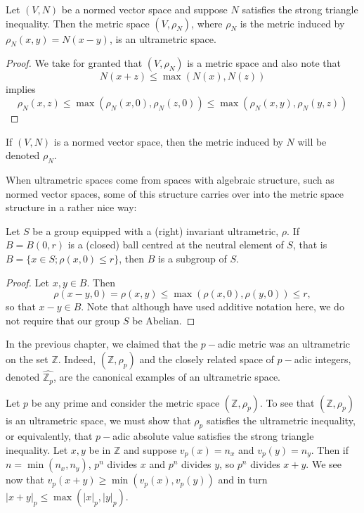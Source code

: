 \begin{proposition}
	Let $(V,N)$ be a normed vector space and suppose $N$ satisfies the strong triangle inequality. Then the metric space $(V,\rho_N)$, where $\rho_N$ is the metric induced by $\rho_N(x,y) = N(x-y)$, is an ultrametric space.
\end{proposition}

\begin{proof}
We take for granted that  $(V,\rho_N)$ is a metric space and also note that 
\[N(x + z) \leq \max(N(x), N(z))\]
 implies  
\[\rho_N(x,z) \leq \max(\rho_N(x,0), \rho_N(z,0)) \leq \max(\rho_N(x,y), \rho_N(y,z))\]
\end{proof}

\begin{notation*}
 If $(V, N)$ is a normed vector space, then the metric induced by $N$ will be denoted $\rho_N$.
\end{notation*}

When ultrametric spaces come from spaces with algebraic structure, such as normed vector spaces, some of this structure carries over into the metric space structure in a rather nice way:\\

\begin{proposition}
\cite{ar} Let $S$ be a  group equipped with a (right) invariant ultrametric, $\rho$. If $B=B(0,r)$ is a (closed) ball centred at the neutral element of $S$, that is $B=\{x \in S; \rho(x,0) \leq r\}$, then $B$ is a subgroup of $S$.
\end{proposition}

\begin{proof}
Let $x,y \in B$. Then \[\rho(x-y,0) = \rho(x,y)  \leq \max(\rho(x,0), \rho(y,0)) \leq r,\]
so that $x-y \in B$. Note that although have used additive notation here, we do not require that our group $S$ be Abelian.
\end{proof}
 
In the previous chapter, we claimed that the $p-$adic metric was an ultrametric on the set $\mathbb{Z}$. Indeed, $(\mathbb{Z}, \rho_p)$ and the closely related space of $p-$adic integers, denoted $\widehat{\mathbb{Z}_p}$, are the canonical examples of an ultrametric space. \\

\begin{example} 
Let $p$ be any prime and consider the metric space $(\mathbb{Z}, \rho_p)$. To see that $(\mathbb{Z}, \rho_p)$ is an ultrametric space, we must show that $\rho_p$ satisfies the ultrametric inequality, or equivalently, that $p-$adic absolute value satisfies the strong triangle inequality. Let $x,y$ be in $\mathbb{Z}$ and suppose $v_p(x)= n_x$ and $v_p(y)= n_y$. Then if $n=\min(n_x,n_y)$, $p^n $ divides $x$ and $p^n$ divides $y$, so $p^n$ divides $x +y$. We see now that $v_p(x+y) \geq \min(v_p(x),  v_p(y))$ and in turn $\lvert x + y \rvert_p \leq \max(\lvert x \rvert_p, \lvert y \rvert_p)$.
\end{example}

